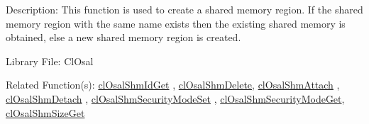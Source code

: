 \begin{Desc}
\item[Description:]This function is used to create a shared memory region. If the shared memory region with the same name exists then the existing shared memory is obtained, else a new shared memory region is created.\end{Desc}
\begin{Desc}
\item[Library File:]Cl\-Osal\end{Desc}
\begin{Desc}
\item[Related Function(s):]\hyperlink{pageosal146}{cl\-Osal\-Shm\-Id\-Get} , \hyperlink{pageosal147}{cl\-Osal\-Shm\-Delete}, 
\hyperlink{pageosal148}{cl\-Osal\-Shm\-Attach} , \hyperlink{pageosal149}{cl\-Osal\-Shm\-Detach} , 
\hyperlink{pageosal150}{cl\-Osal\-Shm\-Security\-Mode\-Set} , \hyperlink{pageosal151}{cl\-Osal\-Shm\-Security\-Mode\-Get}, 
\hyperlink{pageosal152}{cl\-Osal\-Shm\-Size\-Get} \end{Desc}

\newpage
